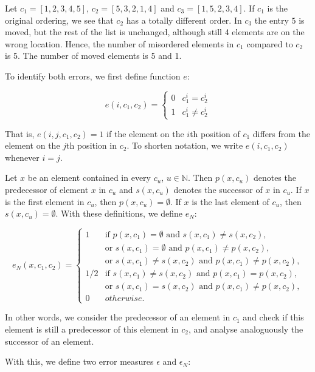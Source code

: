 \begin{exl}\label{ex:errormeasures}
Let $c_1 = [1,2,3,4,5]$, $c_2=[5,3,2,1,4]$ and $c_3=[1,5,2,3,4]$. If $c_1$ is the original ordering, we see that $c_2$ has a totally different order. In $c_3$ the entry $5$ is moved, but the rest of the list is unchanged, although still 4 elements are on the wrong location. Hence, the number of misordered elements in $c_1$ compared to $c_2$ is 5. The number of moved elements is 5 and 1. %
\end{exl}
To identify both errors, we first define function $e$:

\[e(i,c_1, c_2)=\begin{cases}
    0 & c_{1}^{i}=c_{2}^{i}\\
    1 & c_{1}^{i}\neq c_{2}^{i}
\end{cases}\]

That is, $e(i,j,c_1,c_2)=1$ if the element on the $i$th position of $c_1$ 
differs from the element on the $j$th position in $c_2$. 
To shorten notation, we write $e(i,c_1,c_2)$ whenever $i=j$. 

Let $x$ be an element contained in every $c_u$, $u \in \mathbb{N}$. %
Then $ p(x,c_u) $ denotes the predecessor of element $ x $ in $c_u$ 
and $s(x,c_u)$ denotes the successor of $x$ in $c_u$.  
If $x$ is the first element in $c_u$, then $p(x,c_u)=\emptyset$. 
If $x$ is the last element of $c_u$, then $s(x,c_u)=\emptyset$. 
With these definitions, 
we define $e_N$: 

\[e_N(x,c_1, c_2)=\begin{cases}
    1 	& \text{if } p(x,c_1)=\emptyset \text{ and } s(x,c_1) \not = s(x,c_2),\\
        & \text{or } s(x,c_1)=\emptyset \text{ and } p(x,c_1) \not = p(x,c_2),\\
        & \text{or } s(x,c_1) \not = s(x,c_2) \text{ and } p(x,c_1) \not = p(x,c_2),\\
    1/2	& \text{if } s(x,c_1) \not = s(x,c_2) \text{ and } p(x,c_1) = p(x,c_2),\\
        & \text{or } s(x,c_1) = s(x,c_2) \text{ and } p(x,c_1) \not = p(x,c_2),\\
    0	& otherwise. 
\end{cases}\]

In other words, 
we consider the predecessor of an element in $c_1$ and 
check if this element is still a predecessor of this element in $c_2$, 
and analyse analoguously the successor of an element. 

With this, we define two error measures $\epsilon$ and $\epsilon_N$:

